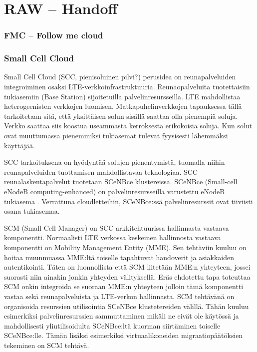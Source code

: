 \documentclass[finnish]{tktltiki2}
\theoremstyle{definition}
\theoremstyle{remark}
\begin{document}
\chapter*{RAW – Handoff} 


\subsection{FMC – Follow me cloud}
\subsection{Small Cell Cloud}
Small Cell Cloud (SCC, pienisoluinen pilvi?) perusidea on reunapalveluiden integroiminen osaksi LTE-verkkoinfrastruktuuria. 
Reunaopalveluita tuotettaisiin tukiasemiin (Base Station) sijoitetuilla palvelinresursseilla.
LTE mahdollistaa heterogeenisten verkkojen luomisen. Matkapuhelinverkkojen tapauksessa tällä tarkoitetaan sitä, että yksittäisen solun sisällä saattaa olla pienempiä soluja.
Verkko saattaa siis koostua useammasta kerroksesta erikokoisia soluja. 
Kun solut ovat muuttumassa pienemmiksi tukiasemat tulevat fyysisesti lähemmäksi käyttäjää.

SCC tarkoituksena on hyödyntää solujen pienentymistä, tuomalla niihin reunapalveluiden tuottamisen mahdollistavaa teknologiaa.
SCC reunalaskentapalvelut tuotetaan SCeNBce klustereissa. 
SCeNBce (Small-cell eNodeB computing-enhanced) on palvelinresursseilla varustettu eNodeB tukiasema \cite{lobillo15scc}.
Verrattuna cloudletteihin, SCeNBce:ssä palvelinresurssit ovat tiiviisti osana tukiasemaa.

SCM (Small Cell Manager) on SCC arkkitehtuurissa hallinnasta vastaava komponentti. Normaalisti LTE verkossa keskeinen hallinnosta vastaava komponentti on Mobility Management Entity (MME). Sen tehtäviin kuuluu on hoitaa muunmuassa MME:ltä toiselle tapahtuvat handoverit ja asiakkaiden autentikointi. Täten on luonnollista että SCM liitetään MME:n yhteyteen, jossei suorasti niin ainakin jonkin yhteyden välityksellä. Eräs ehdotettu tapa toteuttaa SCM onkin integroida se suoraan MME:n yhteyteen jolloin tämä komponentti vastaa sekä reunapalveluista ja LTE-verkon hallinnasta\cite{lobillo15scc}. SCM tehtävänä on organisoida resurssien utilisointia SCeNBce klustetereiden välillä. Tähän kuuluu esimerkiksi palvelinresurssien sammuttaminen mikäli ne eivät ole käytössä ja mahdollisesti yliutilisoidulta SCeNBce:ltä kuorman siirtäminen toiselle SCeNBce:lle. Tämän lisäksi esimerkiksi virtuaalikoneiden migraatiopäätöksien tekeminen on SCM tehtävä.
\end{document}
